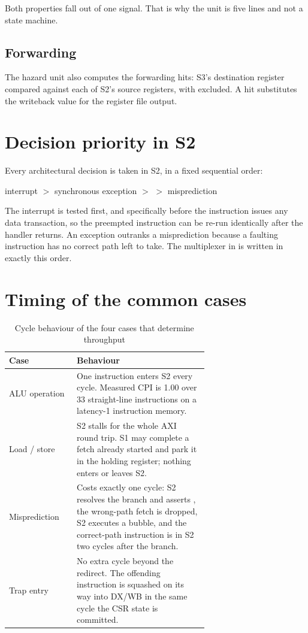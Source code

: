 Both properties fall out of one signal. That is why the unit is five lines and
not a state machine.

\subsection{Forwarding}

The hazard unit also computes the forwarding hits: S3's destination register
compared against each of S2's source registers, with  excluded. A hit
substitutes the writeback value for the register file output.

\section{Decision priority in S2}

Every architectural decision is taken in S2, in a fixed sequential order:

\begin{center}
interrupt \; $>$ \; synchronous exception \; $>$ \;  \; $>$ \; misprediction
\end{center}

The interrupt is tested first, and specifically before the instruction issues any
data transaction, so the preempted instruction can be re-run identically after
the handler returns. An exception outranks a misprediction because a faulting
instruction has no correct path left to take. The  multiplexer
in  is written in exactly this order.

\section{Timing of the common cases}

\begin{table}[H]
\centering
\caption{Cycle behaviour of the four cases that determine throughput}
\label{tab:cputiming}
\begin{tabular}{@{}lL{0.66\linewidth}@{}}
\toprule
\textbf{Case} & \textbf{Behaviour} \\
\midrule
ALU operation & One instruction enters S2 every cycle. Measured CPI is 1.00 over 33
  straight-line instructions on a latency-1 instruction memory. \\
Load / store  & S2 stalls for the whole AXI round trip. S1 may complete a fetch
  already started and park it in the holding register; nothing enters or leaves S2. \\
Misprediction & Costs exactly one cycle: S2 resolves the branch and asserts
  , the wrong-path fetch is dropped, S2 executes a bubble, and the
  correct-path instruction is in S2 two cycles after the branch. \\
Trap entry    & No extra cycle beyond the redirect. The offending instruction is
  squashed on its way into DX/WB in the same cycle the CSR state is committed. \\
\bottomrule
\end{tabular}
\end{table}


